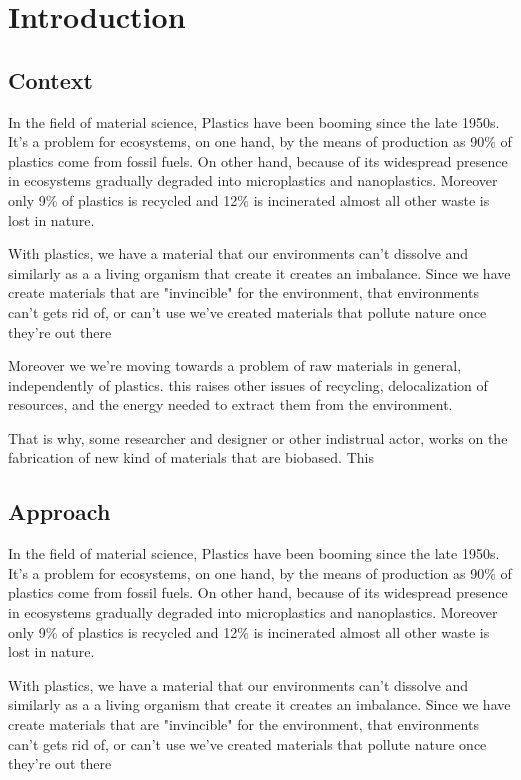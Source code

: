 \chapter{Introduction}

\section{Context}

In the field of material science, Plastics have been booming since the late 1950s\cite{geyer2017production}.
It's a problem for ecosystems, on one hand, by the means of production as 90\% of plastics come from fossil fuels. On other hand,
because of its widespread presence in ecosystems gradually degraded into microplastics and nanoplastics.
Moreover only 9\% of plastics is recycled and 12\% is incinerated almost all other waste is lost in nature\cite{natureeditorial}.

With plastics, we have a material that our environments can't dissolve and similarly as a a living organism that create
it creates an imbalance. Since we have create materials that are "invincible" for the environment,  that environments can't gets rid of, or can't use
we've created materials that pollute nature once they're out there

Moreover we we're moving towards a problem of raw materials in general, independently of plastics. this raises other issues of recycling, 
delocalization of resources, and the energy needed to extract them from the environment.

That is why, some researcher and designer or other indistrual actor, works on the fabrication of new kind of materials that are biobased.
This 

\section{Approach}

In the field of material science, Plastics have been booming since the late 1950s\cite{geyer2017production}.
It's a problem for ecosystems, on one hand, by the means of production as 90\% of plastics come from fossil fuels. On other hand,
because of its widespread presence in ecosystems gradually degraded into microplastics and nanoplastics.
Moreover only 9\% of plastics is recycled and 12\% is incinerated almost all other waste is lost in nature\cite{natureeditorial}.

With plastics, we have a material that our environments can't dissolve and similarly as a a living organism that create
it creates an imbalance. Since we have create materials that are "invincible" for the environment,  that environments can't gets rid of, or can't use
we've created materials that pollute nature once they're out there

